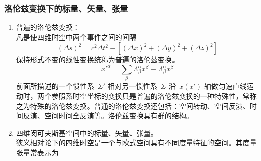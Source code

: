 \subsubsection{洛伦兹变换下的标量、矢量、张量  }
\begin{enumerate}
\item 普遍的洛伦兹变换：\\
凡是使四维时空中两个事件之间的间隔\\
$$(\Delta s)^{2}=c^{2}\Delta t^{2}-[(\Delta x)^{2}+(\Delta y)^{2}+(\Delta z)^{2}]$$
保持形式不变的线性变换统称为普遍的洛伦兹变换。
$$x'^{\alpha}=\sum_{\beta}\Lambda^{\alpha}_{\beta}x^{\beta}\equiv\Lambda^{\alpha}_{\beta}x^{\beta}$$
前面所描述的一个惯性系~$\Sigma'$ 相对另一惯性系~$\Sigma$ 沿~$x(x')$ 轴做匀速直线运动时，两个参照系时空坐标的变换只是普遍的洛伦兹变换的一种特殊性，常称之为特殊的洛伦兹变换。普通的洛伦兹变换还包括：空间转动、空间反演、时间反演、空间时间全反演等。洛伦兹变换具有群的结构。\\
\item 四维闵可夫斯基空间中的标量、矢量、张量。\\
狭义相对论下的四维时空是一个与欧式空间具有不同度量特征的空间。其度量张量常表示为\\




\end{enumerate}
